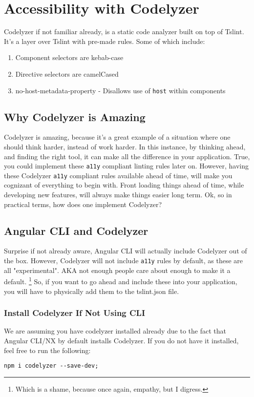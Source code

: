 \chapter{ Accessibility with Codelyzer}    
Codelyzer if not familiar already, is a static code analyzer built on top of Tslint. It's a layer over Tslint with pre-made rules. Some of which include:

\begin{enumerate}
  \item Component selectors are kebab-case
  \item Directive selectors are camelCased
  \item no-host-metadata-property - Disallows use of \lstinline{host} within components
\end{enumerate}

\section{Why Codelyzer is Amazing}
Codelyzer is amazing, because it's a great example of a situation where one should think harder, instead of work harder. In this instance, by thinking ahead, and finding the right tool, it can make all the difference in your application. True, you could implement these \lstinline{a11y} compliant linting rules later on. However, having these Codelyzer \lstinline{a11y} compliant rules available ahead of time, will make you cognizant of everything to begin with. Front loading things ahead of time, while developing new features, will always make things easier long term. Ok, so in practical terms, how does one implement Codelyzer? 

\section{Angular CLI and Codelyzer}
Surprise if not already aware, Angular CLI will actually include Codelyzer out of the box. However, Codelyzer will not include \lstinline{a11y} rules by default, as these are all "experimental". AKA not enough people care about enough to make it a default. \footnote{Which is a shame, because once again, empathy, but I digress.} So, if you want to go ahead and include these into your application, you will have to physically add them to the tslint.json file. 

\subsection{Install Codelyzer If Not Using CLI}
We are assuming you have codelyzer installed already due to the fact that Angular CLI/NX by default installs Codelyzer. If you do not have it installed, feel free to run the following: 
\begin{verbatim}
npm i codelyzer --save-dev;
\end{verbatim}


